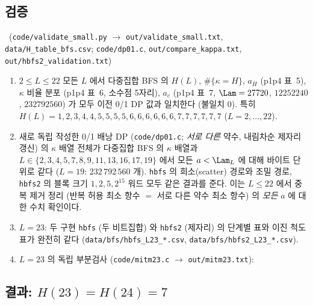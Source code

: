 \subsection{검증}\label{NUM:ssec-valid}

\begin{proposition}[교차검증]\label{NUM:prop-valid}
\NUMERIC\ (\texttt{code/validate\_small.py} $\to$ \texttt{out/validate\_small.txt}, \texttt{data/H\_table\_bfs.csv};
\texttt{code/dp01.c}, \texttt{out/compare\_kappa.txt}, \texttt{out/hbfs2\_validation.txt})
\begin{enumerate}[label=(\arabic*)]
\item $2\le L\le 22$ 모든 $L$ 에서 다중집합 BFS 의 $H(L)$, $\#\{\kappa=H\}$, $a_H$ (p1p4 표~5), $\kappa$ 비율 분포 (p1p4 표~6, 소수점 5자리),
$a_c$ (p1p4 표~7, $\Lam=27720$, $12252240$, $232792560$) 가 모두 이전 0/1 DP 값과 일치한다 (불일치 0).
특히 $H(L)=1,2,3,4,4,5,5,5,5,6,6,6,6,6,6,7,7,7,7,7,7$ ($L=2,\dots,22$).
\item 새로 독립 작성한 0/1 배낭 DP (\texttt{code/dp01.c}; \emph{서로 다른} 약수, 내림차순 제자리 갱신) 의 $\kappa$ 배열 전체가
다중집합 BFS 의 $\kappa$ 배열과 $L\in\{2,3,4,5,7,8,9,11,13,16,17,19\}$ 에서 모든 $a<\Lam_L$ 에 대해 바이트 단위로 같다
($L=19$: $232\,792\,560$ 개). \texttt{hbfs} 의 희소(scatter) 경로와 조밀 경로, \texttt{hbfs2} 의 블록 크기 $1,2,5,2^{15}$ 워드 모두 같은 결과를 준다.
이는 $L\le 22$ 에서 중복 제거 정리 (반복 허용 최소 항수 $=$ 서로 다른 약수 최소 항수) 의 \emph{모든} $a$ 에 대한 수치 확인이다.
\item $L=23$: 두 구현 \texttt{hbfs} (두 비트집합) 와 \texttt{hbfs2} (제자리) 의 단계별 표와 이진 척도 표가 완전히 같다
(\texttt{data/bfs/hbfs\_L23\_*.csv}, \texttt{data/bfs/hbfs2\_L23\_*.csv}).
\item $L=23$ 의 독립 부분검사 (\texttt{code/mitm23.c} $\to$ \texttt{out/mitm23.txt}):
\end{enumerate}
\end{proposition}

\subsection{결과: $H(23)=H(24)=7$}\label{NUM:ssec-H23}

